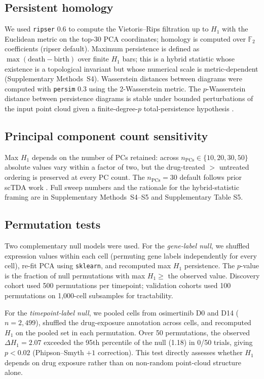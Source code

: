 \subsection*{Persistent homology}

We used \texttt{ripser} 0.6 \citep{bauer2021,tralie2018} to compute the
Vietoris--Rips filtration up to $H_1$ with the Euclidean metric on the
top-30 PCA coordinates; homology is computed over $\mathbb{F}_2$
coefficients (ripser default). Maximum persistence is defined as
$\max(\text{death} - \text{birth})$ over finite $H_1$ bars; this is a
hybrid statistic whose existence is a topological invariant but whose
numerical scale is metric-dependent (Supplementary Methods~S4).
Wasserstein distances between diagrams were computed with
\texttt{persim} 0.3 using the 2-Wasserstein metric. The $p$-Wasserstein
distance between persistence diagrams is stable under bounded
perturbations of the input point cloud given a finite-degree-$p$
total-persistence hypothesis \citep{cohen-steiner2007,cohen-steiner2010}.

\subsection*{Principal component count sensitivity}

Max $H_1$ depends on the number of PCs retained: across
$n_{\text{PCs}} \in \{10, 20, 30, 50\}$ absolute values vary within a
factor of two, but the drug-treated $>$ untreated ordering is
preserved at every PC count. The $n_{\text{PCs}} = 30$ default
follows prior scTDA work \citep{rizvi2017}. Full sweep numbers and
the rationale for the hybrid-statistic framing are in Supplementary
Methods~S4--S5 and Supplementary Table S5.

\subsection*{Permutation tests}

Two complementary null models were used. For the \emph{gene-label null},
we shuffled expression values within each cell (permuting gene labels
independently for every cell), re-fit PCA using \texttt{sklearn}, and
recomputed max $H_1$ persistence. The $p$-value is the fraction of null
permutations with max $H_1 \geq$ the observed value. Discovery cohort
used 500 permutations per timepoint; validation cohorts used 100
permutations on 1{,}000-cell subsamples for tractability.

For the \emph{timepoint-label null}, we pooled cells from osimertinib
D0 and D14 ($n = 2{,}499$), shuffled the drug-exposure annotation across
cells, and recomputed $H_1$ on the pooled set in each permutation.
Over 50 permutations, the observed $\Delta H_1 = 2.07$ exceeded the
95th percentile of the null (1.18) in 0/50 trials, giving
$p < 0.02$ (Phipson--Smyth $+1$ correction). This test directly
assesses whether $H_1$ depends on drug exposure rather than on
non-random point-cloud structure alone.

